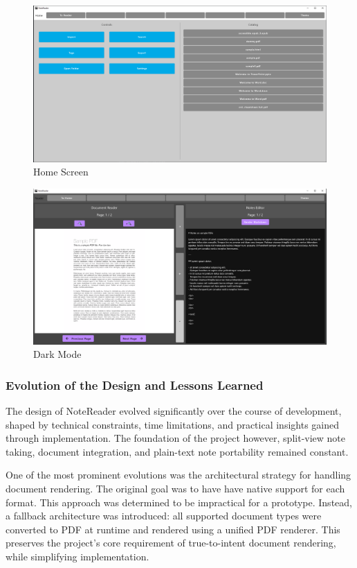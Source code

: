 \begin{figure}
    \centering
    \includegraphics[width=1\linewidth]{Figures/image3.png}
    \caption{Home Screen}
    \label{fig:home}
\end{figure}

\begin{figure}
    \centering
    \includegraphics[width=1\linewidth]{Figures/image4.png}
    \caption{Dark Mode}
    \label{fig:dark}
\end{figure}

\subsubsection{Evolution of the Design and Lessons Learned}

The design of NoteReader evolved significantly over the course of development, shaped by technical constraints, time limitations, and practical insights gained through implementation. The foundation of the project however, split-view note taking, document integration, and plain-text note portability remained constant.

One of the most prominent evolutions was the architectural strategy for handling document rendering. The original goal was to have have native support for each format. This approach was determined to be impractical for a prototype. Instead, a fallback architecture was introduced: all supported document types were converted to PDF at runtime and rendered using a unified PDF renderer. This preserves the project's core requirement of true-to-intent document rendering, while simplifying implementation.

